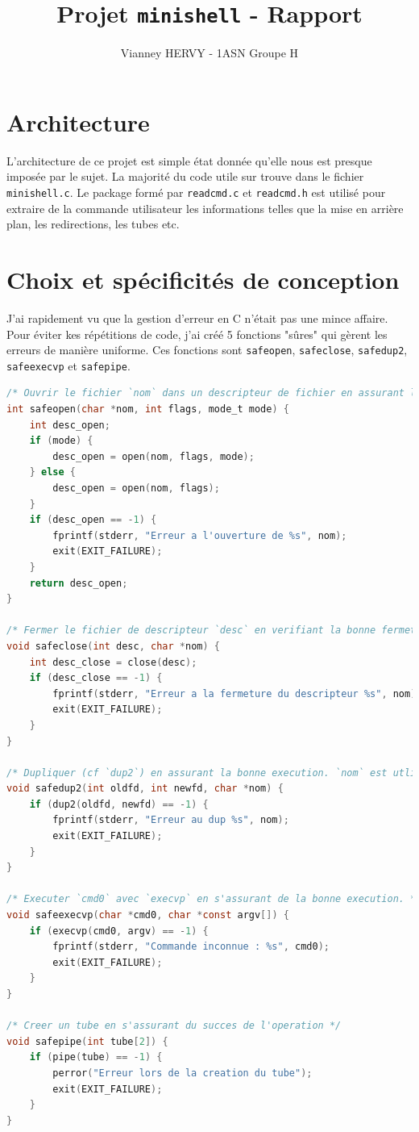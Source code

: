 \documentclass{article}
\title{Projet \texttt{minishell} - Rapport}
\author{Vianney HERVY - 1ASN Groupe H}
\begin{document}
\maketitle
\tableofcontents
\newpage

\section{Architecture}

L'architecture de ce projet est simple état donnée qu'elle nous est presque imposée par le sujet. La majorité du code utile sur trouve dans le fichier \texttt{minishell.c}. Le package formé par \texttt{readcmd.c} et \texttt{readcmd.h} est utilisé pour extraire de la commande utilisateur les informations telles que la mise en arrière plan, les redirections, les tubes etc.

\section{Choix et spécificités de conception}

J'ai rapidement vu que la gestion d'erreur en C n'était pas une mince affaire. Pour éviter kes répétitions de code, j'ai créé 5 fonctions "sûres" qui gèrent les erreurs de manière uniforme. Ces fonctions sont \texttt{safeopen}, \texttt{safeclose}, \texttt{safedup2}, \texttt{safeexecvp} et \texttt{safepipe}.

\begin{lstlisting}[language=C, caption=Code des fonctions "sûres"]
/* Ouvrir le fichier `nom` dans un descripteur de fichier en assurant la bonne execution. Retourne le descripteur de fichier associe. */
int safeopen(char *nom, int flags, mode_t mode) {
    int desc_open;
    if (mode) {
        desc_open = open(nom, flags, mode);
    } else {
        desc_open = open(nom, flags);
    }
    if (desc_open == -1) {
        fprintf(stderr, "Erreur a l'ouverture de %s", nom);
        exit(EXIT_FAILURE);
    }
    return desc_open;
}

/* Fermer le fichier de descripteur `desc` en verifiant la bonne fermeture. `nom` est utilise en cas d'erreur. */
void safeclose(int desc, char *nom) {
    int desc_close = close(desc);
    if (desc_close == -1) {
        fprintf(stderr, "Erreur a la fermeture du descripteur %s", nom);
        exit(EXIT_FAILURE);
    }
}

/* Dupliquer (cf `dup2`) en assurant la bonne execution. `nom` est utlise en cas d'erreur. */
void safedup2(int oldfd, int newfd, char *nom) {
    if (dup2(oldfd, newfd) == -1) {
        fprintf(stderr, "Erreur au dup %s", nom);
        exit(EXIT_FAILURE);
    }
}

/* Executer `cmd0` avec `execvp` en s'assurant de la bonne execution. */
void safeexecvp(char *cmd0, char *const argv[]) {
    if (execvp(cmd0, argv) == -1) {
        fprintf(stderr, "Commande inconnue : %s", cmd0);
        exit(EXIT_FAILURE);
    }
}

/* Creer un tube en s'assurant du succes de l'operation */
void safepipe(int tube[2]) {
    if (pipe(tube) == -1) {
        perror("Erreur lors de la creation du tube");
        exit(EXIT_FAILURE);
    }
}
\end{lstlisting}
\end{document}
